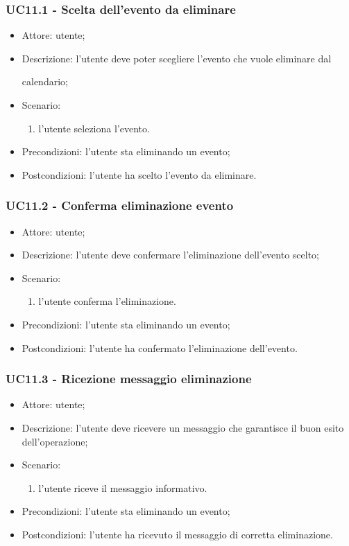 \subsubsection{UC11.1 - Scelta dell'evento da eliminare}
\begin{itemize}
    \item Attore: utente;
    \item Descrizione: l'utente deve poter scegliere l'evento che vuole eliminare dal \par calendario;
    \item Scenario:
        \begin{enumerate}
        \item l'utente seleziona l'evento.
        \end{enumerate}
    
    \item Precondizioni: l'utente sta eliminando un evento;
    \item Postcondizioni: l'utente ha scelto l'evento da eliminare.
\end{itemize}


\subsubsection{UC11.2 - Conferma eliminazione evento}
\begin{itemize}
    \item Attore: utente;
    \item Descrizione: l'utente deve confermare l'eliminazione dell'evento scelto;
    \item Scenario:
        \begin{enumerate}
        \item l'utente conferma l'eliminazione.
        \end{enumerate}
    
    \item Precondizioni: l'utente sta eliminando un evento;
    \item Postcondizioni: l'utente ha confermato l'eliminazione dell'evento.
\end{itemize}


\subsubsection{UC11.3 - Ricezione messaggio eliminazione}
\begin{itemize}
    \item Attore: utente;
    \item Descrizione: l'utente deve ricevere un messaggio che garantisce il buon esito dell'operazione;
    \item Scenario:
        \begin{enumerate}
        \item l'utente riceve il messaggio informativo.
        \end{enumerate}
    
    \item Precondizioni: l'utente sta eliminando un evento;
    \item Postcondizioni: l'utente ha ricevuto il messaggio di corretta eliminazione.
\end{itemize}



